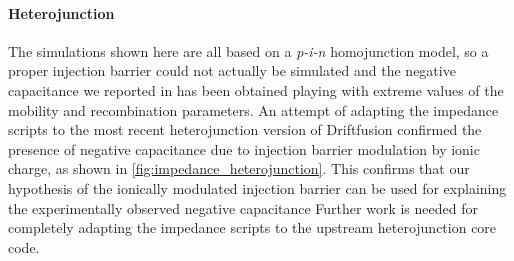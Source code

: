 	\begin{figure}
	\end{figure}

	\paragraph{Heterojunction}
	The simulations shown here are all based on a \textit{p-i-n} homojunction model, so a proper injection barrier could not actually be simulated and the negative capacitance we reported in  has been obtained playing with extreme values of the mobility and recombination parameters.
	An attempt of adapting the impedance scripts to the most recent heterojunction version of Driftfusion confirmed the presence of negative capacitance due to injection barrier modulation by ionic charge, as shown in \cref{fig:impedance_heterojunction}.
	This confirms that our hypothesis of the ionically modulated injection barrier can be used for explaining the experimentally observed negative capacitance \cite{Guerrero2016,Moia2019,Ghahremanirad2017,Sanchez2014}
	Further work is needed for completely adapting the impedance scripts to the upstream heterojunction core code.

